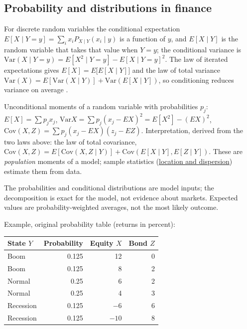 \subsection{Probability and distributions in finance}

\begin{qfdefinition}\label{def:conditional-moments}
 For discrete random variables the conditional expectation $E[X\mid Y=y]=\sum_i x_iP_{X\mid Y}(x_i\mid y)$ is a function of $y$, and $E[X\mid Y]$ is the random variable that takes that value when $Y=y$; the conditional variance is $\mathrm{Var}(X\mid Y=y)=E[X^2\mid Y=y]-E[X\mid Y=y]^2$. The law of iterated expectations gives $E[X]=E\bigl[E[X\mid Y]\bigr]$ and the law of total variance $\mathrm{Var}(X)=E[\mathrm{Var}(X\mid Y)]+\mathrm{Var}(E[X\mid Y])$, so conditioning reduces variance on average \citep[sec.~5.1.5]{probability-statistics-random-processes}.

 Unconditional moments of a random variable with probabilities $p_j$: $E[X]=\sum p_jx_j$, $\mathrm{Var}X=\sum p_j(x_j-EX)^2=E[X^2]-(EX)^2$, $\mathrm{Cov}(X,Z)=\sum p_j(x_j-EX)(z_j-EZ)$. Interpretation, derived from the two laws above: the law of total covariance, $\mathrm{Cov}(X,Z)=E[\mathrm{Cov}(X,Z\mid Y)]+\mathrm{Cov}(E[X\mid Y],E[Z\mid Y])$. These are \emph{population} moments of a model; sample statistics (\hyperref[def:return-sample-statistics]{location and dispersion}) estimate them from data.

 The probabilities and conditional distributions are model inputs; the decomposition is exact for the model, not evidence about markets. Expected values are probability-weighted averages, not the most likely outcome.

 Example, original probability table (returns in percent):

\begin{center}\small
\begin{tabular}{@{}lrrr@{}}
\toprule
State $Y$ & Probability & Equity $X$ & Bond $Z$ \\
\midrule
Boom & 0.125 & 12 & 0 \\
Boom & 0.125 & 8 & 2 \\
Normal & 0.25 & 6 & 2 \\
Normal & 0.25 & 4 & 3 \\
Recession & 0.125 & $-6$ & 6 \\
Recession & 0.125 & $-10$ & 8 \\
\bottomrule
\end{tabular}
\end{center}


\end{qfdefinition}
